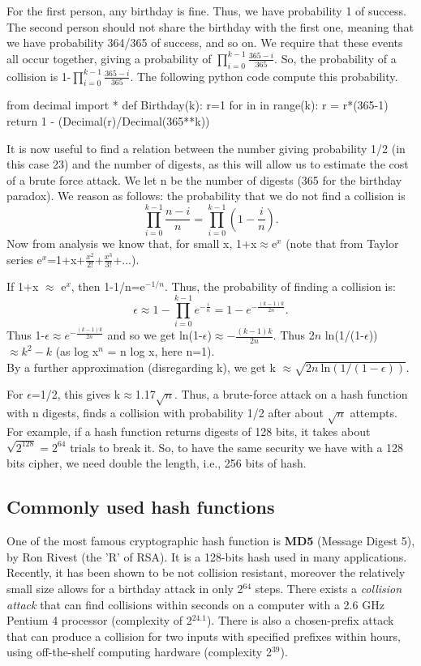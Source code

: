 \documentclass[a4paper, 12pt]{report}
\begin{document}
For the first person, any birthday is fine. Thus, we have probability 1 of success. The second person should not share the birthday with the first one, meaning that we have probability 364/365 of success, and so on. We require that these events all occur together, giving a probability of $\prod_{i=0}^{k-1}\frac{365-i}{365}$. So, the probability of a collision is 1-$\prod_{i=0}^{k-1}\frac{365-i}{365}$. The following python code compute this probability.
\begin{python}
from decimal import *
def Birthday(k):
	r=1
	for in in range(k):
		r = r*(365-1)
	return 1 - (Decimal(r)/Decimal(365**k))
\end{python}

It is now useful to find a relation between the number giving probability 1/2 (in this case 23) and the number of digests, as this will allow us to estimate the cost of a brute force attack. We let n be the number of digests (365 for the birthday paradox). We reason as follows: the probability that we do not find a collision is \[\prod_{i=0}^{k-1}\frac{n-i}{n} = \prod_{i=0}^{k-1}\left(1-\frac{i}{n}\right).\]
Now from analysis we know that, for small x, 1+x$\approx$e$^x$ (note that from Taylor series e$^x$=1+x+$\frac{x^2}{2!}$+$\frac{x^3}{3!}$+...).

If 1+x $\approx$ e$^x$, then 1-1/n=e$^{-1/n}$. Thus, the probability of finding a collision is:
\[\epsilon \approx 1-\prod_{i=0}^{k-1}e^{-\frac{i}{n}} = 1-e^{-\frac{(k-1)k}{2n}}.\]
Thus 1-$\epsilon \approx e^{-\frac{(k-1)k}{2n}}$ and so we get ln(1-$\epsilon$)$\approx -\frac{(k-1)k}{2n}$. Thus 2$n$ ln(1/(1-$\epsilon$)) $\approx k^2-k$ (as log x$^n$ = n log x, here n=1).\\By a further approximation (disregarding k), we get k $\approx\sqrt{2n \ \text{ln}(1/(1-\epsilon))}$.

For $\epsilon$=1/2, this gives k$\approx$1.17$\sqrt{n}$. Thus, a brute-force attack on a hash function with n digests, finds a collision with probability 1/2 after about $\sqrt{n}$ attempts. For example, if a hash function returns digests of 128 bits, it takes about $\sqrt{2^{128}}=2^{64}$ trials to break it. So, to have the same security we have with a 128 bits cipher, we need double the length, i.e., 256 bits of hash.

\subsection*{Commonly used hash functions}
One of the most famous cryptographic hash function is \textbf{MD5} (Message Digest 5), by Ron Rivest (the 'R' of RSA). It is a 128-bits hash used in many applications. Recently, it has been shown to be not collision resistant, moreover the relatively small size allows for a birthday attack in only 2$^{64}$ steps. There exists a \textit{collision attack} that can find collisions within seconds on a computer with a 2.6 GHz Pentium 4 processor (complexity of 2$^{24.1}$). There is also a chosen-prefix attack that can produce a collision for two inputs with specified prefixes within hours, using off-the-shelf computing hardware (complexity 2$^{39}$).
\end{document}
